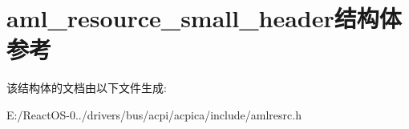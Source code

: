 \hypertarget{structaml__resource__small__header}{}\section{aml\+\_\+resource\+\_\+small\+\_\+header结构体 参考}
\label{structaml__resource__small__header}


该结构体的文档由以下文件生成\+:\begin{DoxyCompactItemize}
\item 
E\+:/\+React\+O\+S-\/0../drivers/bus/acpi/acpica/include/amlresrc.\+h\end{DoxyCompactItemize}
